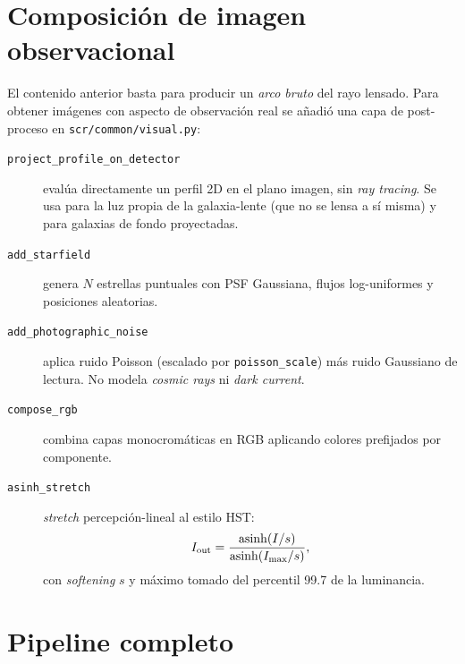 \documentclass[11pt,a4paper]{article}
\begin{document}
\section{Composición de imagen observacional}

El contenido anterior basta para producir un \emph{arco bruto} del rayo
lensado. Para obtener imágenes con aspecto de observación real se añadió
una capa de post-proceso en \texttt{scr/common/visual.py}:

\begin{description}
  \item[\texttt{project\_profile\_on\_detector}] evalúa directamente un
        perfil 2D en el plano imagen, sin \emph{ray tracing}. Se usa para
        la luz propia de la galaxia-lente (que no se lensa a sí misma) y
        para galaxias de fondo proyectadas.
  \item[\texttt{add\_starfield}] genera $N$ estrellas puntuales con PSF
        Gaussiana, flujos log-uniformes y posiciones aleatorias.
  \item[\texttt{add\_photographic\_noise}] aplica ruido Poisson
        (escalado por \texttt{poisson\_scale}) más ruido Gaussiano de
        lectura. No modela \emph{cosmic rays} ni \emph{dark current}.
  \item[\texttt{compose\_rgb}] combina capas monocromáticas en RGB
        aplicando colores prefijados por componente.
  \item[\texttt{asinh\_stretch}] \emph{stretch} percepción-lineal al
        estilo HST:
        \begin{equation}
          I_{\rm out} = \frac{\mathrm{asinh}(I/s)}{\mathrm{asinh}(I_{\max}/s)},
        \end{equation}
        con \emph{softening} $s$ y máximo tomado del percentil 99.7 de
        la luminancia.
\end{description}


\section{Pipeline completo}
\end{document}
